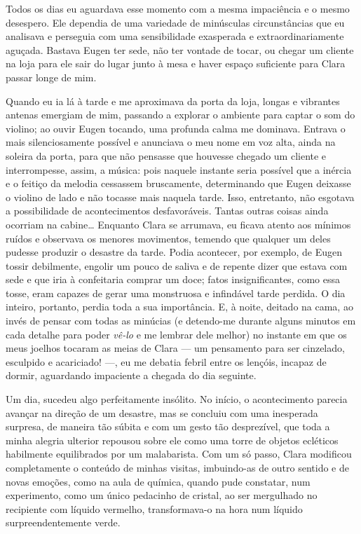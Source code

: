 Todos os dias eu aguardava esse momento com a mesma impaciência e o mesmo desespero. Ele dependia de uma variedade de minúsculas circunstâncias que eu analisava e perseguia com uma sensibilidade exasperada e extraordinariamente aguçada. Bastava Eugen ter sede, não ter vontade de tocar, ou chegar um cliente na loja para ele sair do lugar junto à mesa e haver espaço suficiente para Clara passar longe de mim.

Quando eu ia lá à tarde e me aproximava da porta da loja, longas e vibrantes antenas emergiam de mim, passando a explorar o ambiente para captar o som do violino; ao ouvir Eugen tocando, uma profunda calma me dominava. Entrava o mais silenciosamente possível e anunciava o meu nome em voz alta, ainda na soleira da porta, para que não pensasse que houvesse chegado um cliente e interrompesse, assim, a música: pois naquele instante seria possível que a inércia e o feitiço da melodia cessassem bruscamente, determinando que Eugen deixasse o violino de lado e não tocasse mais naquela tarde. Isso, entretanto, não esgotava a possibilidade de acontecimentos desfavoráveis. Tantas outras coisas ainda ocorriam na cabine\ldots{} Enquanto Clara se arrumava, eu ficava atento aos mínimos ruídos e observava os menores movimentos, temendo que qualquer um deles pudesse produzir o desastre da tarde. Podia acontecer, por exemplo, de Eugen tossir debilmente, engolir um pouco de saliva e de repente dizer que estava com sede e que iria à confeitaria comprar um doce; fatos insignificantes, como essa tosse, eram capazes de gerar uma monstruosa e infindável tarde perdida. O dia inteiro, portanto, perdia toda a sua importância. E, à noite, deitado na cama, ao invés de pensar com todas as minúcias (e detendo-me durante alguns minutos em cada detalhe para poder \textit{vê-lo} e me lembrar dele melhor) no instante em que os meus joelhos tocaram as meias de Clara --- um pensamento para ser cinzelado, esculpido e acariciado! ---, eu me debatia febril entre os lençóis, incapaz de dormir, aguardando impaciente a chegada do dia seguinte.

Um dia, sucedeu algo perfeitamente insólito. No início, o acontecimento parecia avançar na direção de um desastre, mas se concluiu com uma inesperada surpresa, de maneira tão súbita e com um gesto tão desprezível, que toda a minha alegria ulterior repousou sobre ele como uma torre de objetos ecléticos habilmente equilibrados por um malabarista.
Com um só passo, Clara modificou completamente o conteúdo de minhas visitas, imbuindo-as de outro sentido e de novas emoções, como na aula de química, quando pude constatar, num experimento, como um único pedacinho de cristal, ao ser mergulhado no recipiente com líquido vermelho, transformava-o na hora num líquido surpreendentemente verde.

